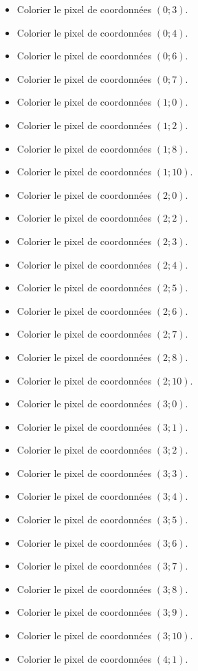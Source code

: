 \documentclass{exos}
\begin{document}
\begin{alphaquestions}
\begin{itemize}
\item Colorier le pixel de coordonnées $(0;3)$.  
\item Colorier le pixel de coordonnées $(0;4)$.  
\item Colorier le pixel de coordonnées $(0;6)$.  
\item Colorier le pixel de coordonnées $(0;7)$.  
\item Colorier le pixel de coordonnées $(1;0)$.  
\item Colorier le pixel de coordonnées $(1;2)$.  
\item Colorier le pixel de coordonnées $(1;8)$.  
\item Colorier le pixel de coordonnées $(1;10)$.  
\item Colorier le pixel de coordonnées $(2;0)$.  
\item Colorier le pixel de coordonnées $(2;2)$.  
\item Colorier le pixel de coordonnées $(2;3)$.  
\item Colorier le pixel de coordonnées $(2;4)$.  
\item Colorier le pixel de coordonnées $(2;5)$.  
\item Colorier le pixel de coordonnées $(2;6)$.  
\item Colorier le pixel de coordonnées $(2;7)$.  
\item Colorier le pixel de coordonnées $(2;8)$.  
\item Colorier le pixel de coordonnées $(2;10)$.  
\item Colorier le pixel de coordonnées $(3;0)$.  
\item Colorier le pixel de coordonnées $(3;1)$.  
\item Colorier le pixel de coordonnées $(3;2)$.  
\item Colorier le pixel de coordonnées $(3;3)$.  
\item Colorier le pixel de coordonnées $(3;4)$.  
\item Colorier le pixel de coordonnées $(3;5)$.  
\item Colorier le pixel de coordonnées $(3;6)$.  
\item Colorier le pixel de coordonnées $(3;7)$.  
\item Colorier le pixel de coordonnées $(3;8)$.  
\item Colorier le pixel de coordonnées $(3;9)$.  
\item Colorier le pixel de coordonnées $(3;10)$.  
\item Colorier le pixel de coordonnées $(4;1)$. 

\end{itemize}
\end{alphaquestions}
\end{document}
